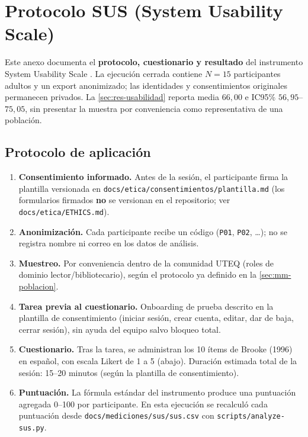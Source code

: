 \section{Protocolo SUS (System Usability Scale)}

Este anexo documenta el \textbf{protocolo, cuestionario y resultado}
del instrumento System Usability Scale \citep{brooke1996sus}. La ejecución
cerrada contiene $N=15$ participantes adultos y un export anonimizado;
las identidades y consentimientos originales permanecen privados. La
\autoref{sec:res-usabilidad} reporta media $66{,}00$ e IC95\%
$56{,}95$--$75{,}05$, sin presentar la muestra por conveniencia como
representativa de una población.

\subsection{Protocolo de aplicación}

\begin{enumerate}[leftmargin=1.2cm]
  \item \textbf{Consentimiento informado.} Antes de la sesión, el
    participante firma la plantilla versionada en
    \texttt{docs/etica/consentimientos/plantilla.md} (los formularios
    firmados \textbf{no} se versionan en el repositorio; ver
    \texttt{docs/etica/ETHICS.md}).
  \item \textbf{Anonimización.} Cada participante recibe un código
    (\texttt{P01}, \texttt{P02}, \ldots); no se registra nombre ni
    correo en los datos de análisis.
  \item \textbf{Muestreo.} Por conveniencia dentro de la comunidad UTEQ
    (roles de dominio lector/bibliotecario), según el protocolo ya
    definido en la \autoref{sec:mm-poblacion}.
  \item \textbf{Tarea previa al cuestionario.} Onboarding de prueba
    descrito en la plantilla de consentimiento (iniciar sesión, crear
    cuenta, editar, dar de baja, cerrar sesión), sin ayuda del equipo
    salvo bloqueo total.
  \item \textbf{Cuestionario.} Tras la tarea, se administran los 10
    ítems de Brooke (1996) en español, con escala Likert de 1 a 5
    (abajo). Duración estimada total de la sesión: 15--20 minutos
    (según la plantilla de consentimiento).
  \item \textbf{Puntuación.} La fórmula estándar
    del instrumento produce una puntuación agregada 0--100 por
    participante. En esta ejecución se recalculó cada puntuación desde
    \texttt{docs/mediciones/sus/sus.csv} con
    \texttt{scripts/analyze-sus.py}.
\end{enumerate}

